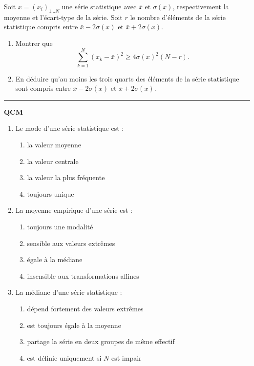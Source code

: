 \documentclass[../PolyS4.tex]{subfiles}
\begin{document}

Soit $x = (x_i)_{1 \ldots N}$ une série statistique avec $\bar{x}$ et $\sigma(x)$, respectivement la moyenne et l'écart-type de la série. Soit $r$ le nombre d'éléments de la série statistique compris entre $\bar x - 2\sigma(x)$ et $\bar x + 2\sigma(x)$.

\begin{enumerate}
    \item Montrer que 
    \[
    \sum_{k=1}^{N} (x_k - \bar x)^2 \geq 4\sigma(x)^2 (N - r).
    \]
    \item En déduire qu'au moins les trois quarts des éléments de la série statistique sont compris entre $\bar x - 2\sigma(x)$ et $\bar x + 2\sigma(x)$.
\end{enumerate}

\vspace{1em}
\hrule
\vspace{1em}

\textbf{QCM}

\begin{enumerate}
\item Le mode d'une série statistique est :
\begin{enumerate}
\item la valeur moyenne
\item la valeur centrale
\item la valeur la plus fréquente
\item toujours unique
\end{enumerate}

\item La moyenne empirique d'une série est :
\begin{enumerate}
\item toujours une modalité
\item sensible aux valeurs extrêmes
\item égale à la médiane
\item insensible aux transformations affines
\end{enumerate}

\item La médiane d'une série statistique :
\begin{enumerate}
\item dépend fortement des valeurs extrêmes
\item est toujours égale à la moyenne
\item partage la série en deux groupes de même effectif
\item est définie uniquement si $N$ est impair
\end{enumerate}
\end{enumerate}
\end{document}
